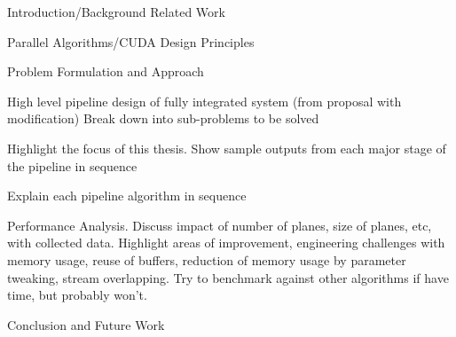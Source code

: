 Introduction/Background
Related Work

Parallel Algorithms/CUDA Design Principles

Problem Formulation and Approach

High level pipeline design of fully integrated system (from proposal with modification)
Break down into sub-problems to be solved

Highlight the focus of this thesis. Show sample outputs from each major stage of the pipeline in sequence

Explain each pipeline algorithm in sequence

Performance Analysis. Discuss impact of number of planes, size of planes, etc, with collected data. Highlight areas of improvement, engineering challenges with memory usage, reuse of buffers, reduction of memory usage by parameter tweaking, stream overlapping. Try to benchmark against other algorithms if have time, but probably won't.

Conclusion and Future Work